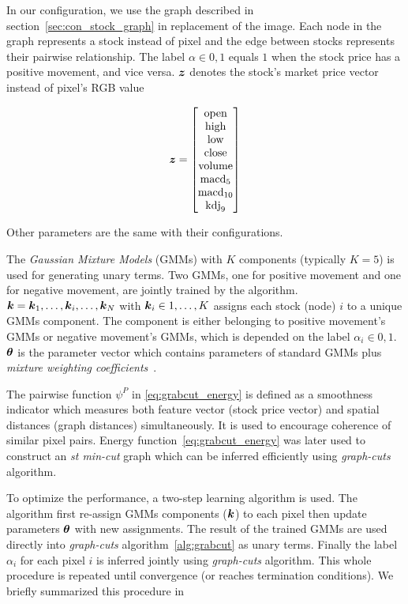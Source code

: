 In our configuration, we use the graph described in
section~\ref{sec:con_stock_graph} in replacement of the image.
Each node in the graph represents a stock instead of pixel and
the edge between stocks represents their pairwise relationship.
The label $\alpha \in {0,1}$ equals $1$ when the stock price has
a positive movement, and vice versa. ${\boldsymbol{z}}$ denotes the stock's
market price vector instead of pixel's RGB value

\begin{align}
  \label{eq:feature_vector}
  \bz =
  \begin{bmatrix}
    \text{open} \\
    \text{high} \\
    \text{low} \\
    \text{close} \\
    \text{volume} \\
    \text{macd}_5 \\
    \text{macd}_{10} \\
    \text{kdj}_9
  \end{bmatrix}
\end{align}

\noindent Other parameters are the same with their configurations.

The \emph{Gaussian Mixture Models} (GMMs) with $K$ components
(typically $K=5$) is used for generating unary terms. Two GMMs,
one for positive movement and one for negative movement, are
jointly trained by the algorithm.
${\boldsymbol{k}}={{\boldsymbol{k}}_1,\dots,{\boldsymbol{k}}_i,\dots,{\boldsymbol{k}}_N}$ with ${\boldsymbol{k}}_i\in 1,\dots,K$
assigns each stock (node) $i$ to a unique GMMs component. The
component is either belonging to positive movement's GMMs or
negative movement's GMMs, which is depended on the label
$\alpha_i\in {0,1}$. $\boldsymbol{\theta}$ is the parameter vector which
contains parameters of standard GMMs plus \emph{mixture weighting
  coefficients}~\cite{Rother:SIGGRAPH04}.

The pairwise function $\psi^P$ in \eqref{eq:grabcut_energy} is
defined as a smoothness indicator which measures both feature
vector (stock price vector) and spatial distances (graph
distances) simultaneously. It is used to encourage coherence of
similar pixel pairs. Energy function~\eqref{eq:grabcut_energy}
was later used to construct an \emph{st min-cut} graph which can
be inferred efficiently using
\emph{graph-cuts}~\cite{Boykov:ICCV01} algorithm.

To optimize the performance, a two-step learning algorithm is
used. The algorithm first re-assign GMMs components (${\boldsymbol{k}}$) to
each pixel then update parameters $\boldsymbol{\theta}$ with new assignments.
The result of the trained GMMs are used directly into
\emph{graph-cuts} algorithm~\ref{alg:grabcut} as unary terms.
Finally the label $\alpha_i$ for each pixel $i$ is inferred
jointly using \emph{graph-cuts} algorithm. This whole procedure
is repeated until convergence (or reaches termination
conditions). We briefly summarized this procedure in

